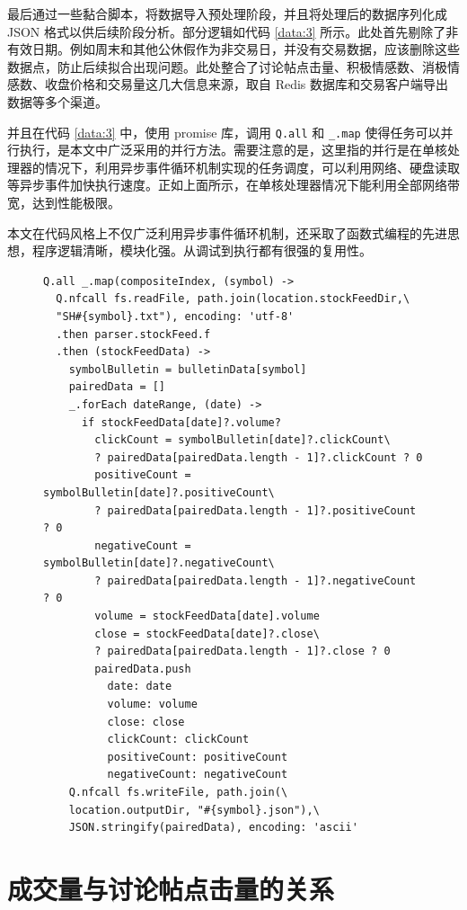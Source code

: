 最后通过一些黏合脚本，将数据导入预处理阶段，并且将处理后的数据序列化成 JSON 格式以供后续阶段分析。部分逻辑如代码 \ref{data:3} 所示。此处首先剔除了非有效日期。例如周末和其他公休假作为非交易日，并没有交易数据，应该删除这些数据点，防止后续拟合出现问题。此处整合了讨论帖点击量、积极情感数、消极情感数、收盘价格和交易量这几大信息来源，取自 Redis 数据库和交易客户端导出数据等多个渠道。

并且在代码 \ref{data:3} 中，使用 promise 库，调用 \texttt{Q.all} 和 \texttt{\_.map} 使得任务可以并行执行，是本文中广泛采用的并行方法。需要注意的是，这里指的并行是在单核处理器的情况下，利用异步事件循环机制实现的任务调度，可以利用网络、硬盘读取等异步事件加快执行速度。正如上面所示，在单核处理器情况下能利用全部网络带宽，达到性能极限。

本文在代码风格上不仅广泛利用异步事件循环机制，还采取了函数式编程的先进思想，程序逻辑清晰，模块化强。从调试到执行都有很强的复用性。

\begin{figure}
  \begin{minipage}{\textwidth}
    \begin{lstlisting}[caption=数据组合, label=data:3]
Q.all _.map(compositeIndex, (symbol) ->
  Q.nfcall fs.readFile, path.join(location.stockFeedDir,\
  "SH#{symbol}.txt"), encoding: 'utf-8'
  .then parser.stockFeed.f
  .then (stockFeedData) ->
    symbolBulletin = bulletinData[symbol]
    pairedData = []
    _.forEach dateRange, (date) ->
      if stockFeedData[date]?.volume?
        clickCount = symbolBulletin[date]?.clickCount\
        ? pairedData[pairedData.length - 1]?.clickCount ? 0
        positiveCount = symbolBulletin[date]?.positiveCount\
        ? pairedData[pairedData.length - 1]?.positiveCount ? 0
        negativeCount = symbolBulletin[date]?.negativeCount\
        ? pairedData[pairedData.length - 1]?.negativeCount ? 0
        volume = stockFeedData[date].volume
        close = stockFeedData[date]?.close\
        ? pairedData[pairedData.length - 1]?.close ? 0
        pairedData.push
          date: date
          volume: volume
          close: close
          clickCount: clickCount
          positiveCount: positiveCount
          negativeCount: negativeCount
    Q.nfcall fs.writeFile, path.join(\
    location.outputDir, "#{symbol}.json"),\
    JSON.stringify(pairedData), encoding: 'ascii'
    \end{lstlisting}
  \end{minipage}
\end{figure}

\chapter{成交量与讨论帖点击量的关系}

